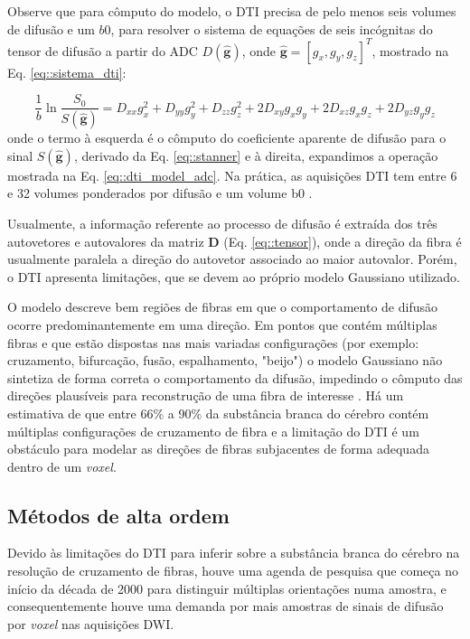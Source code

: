 \documentclass[
    12pt,                %
    oneside,            %
    a4paper,            %
    english,            %
    french,                %
    spanish,            %
    brazil                %
    ]{abntex2}
\begin{document}
Observe que para cômputo do modelo, o DTI precisa de pelo menos seis volumes de difusão e um $b0$, para resolver o sistema de equações de seis incógnitas do tensor de difusão a partir do ADC $D(\mathbf{\hat{g}})$, onde $\mathbf{\hat{g}} = [g_x, g_y, g_z]^T$, mostrado na Eq. \ref{eq::sistema_dti}:

\begin{equation}
\label{eq::sistema_dti}
\frac{1}{b}\ln{\frac{S_0}{S(\mathbf{\hat{g}})}}=D_{x x} g_{x}^{2} +D_{y y} g_{y}^{2}+D_{z z} g_{z}^{2}+2 D_{x y} g_{x} g_{y} +2 D_{x z} g_{x} g_{z}+2 D_{y z} g_{y} g_{z}
\end{equation}
onde o termo à esquerda é o cômputo do coeficiente aparente de difusão para o sinal $S(\mathbf{\hat{g}})$, derivado da Eq. \ref{eq::stanner} e à direita, expandimos a operação mostrada na Eq. \ref{eq::dti_model_adc}. Na prática, as aquisições DTI tem entre 6 e 32 volumes ponderados por difusão e um volume b0 \cite{descoteaux2015}. 

Usualmente, a informação referente ao processo de difusão é extraída dos três autovetores e autovalores da matriz $\mathbf{D}$ (Eq. \ref{eq::tensor}), onde a direção da fibra é usualmente paralela a direção do autovetor associado ao maior autovalor.
Porém, o DTI apresenta limitações, que se devem ao próprio modelo Gaussiano utilizado.

O modelo descreve bem regiões de fibras em que o comportamento de difusão ocorre predominantemente em uma direção. Em pontos que contém múltiplas fibras e que estão dispostas nas mais variadas configurações (por exemplo: cruzamento, bifurcação, fusão, espalhamento, "beijo") o modelo Gaussiano não sintetiza de forma correta o comportamento da difusão, impedindo o cômputo das direções plausíveis para reconstrução de uma fibra de interesse \cite{fillard2011, daducci2014}. Há um estimativa de que entre 66\% a 90\% da substância branca do cérebro contém múltiplas configurações de cruzamento de fibra \cite{descoteaux2015} e a limitação do DTI é um obstáculo para modelar as direções de fibras subjacentes de forma adequada dentro de um \textit{voxel}.

\subsection{Métodos de alta ordem}
\label{metodos_de_alta_ordem}

Devido às limitações do DTI para inferir sobre a substância branca do cérebro na resolução de cruzamento de fibras, houve uma agenda de pesquisa que começa no início da década de 2000 para distinguir múltiplas orientações numa amostra, e consequentemente houve uma demanda por mais amostras de sinais de difusão por \textit{voxel} nas aquisições DWI. %
\end{document}
